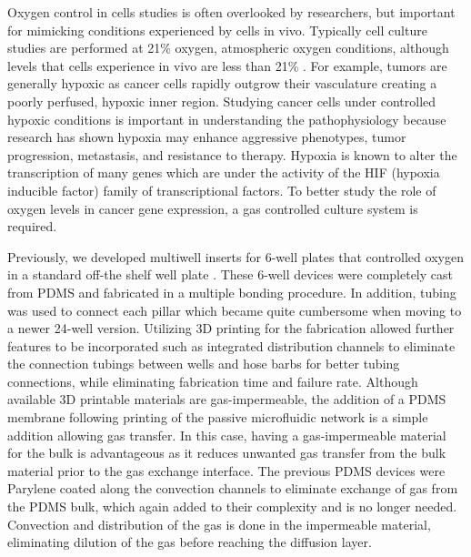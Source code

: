 \documentclass[10pt,letterpaper]{article}
\begin{document}
Oxygen control in cells studies is often overlooked by researchers, but important for mimicking conditions experienced by cells in vivo.
Typically cell culture studies are performed at 21\% oxygen, atmospheric oxygen conditions, although levels that cells experience in vivo are less than 21\% \cite{Brennan2014}.
For example, tumors are generally hypoxic as cancer cells rapidly outgrow their vasculature creating a poorly perfused, hypoxic inner region\cite{Kumar2014}.
Studying cancer cells under controlled hypoxic conditions is important in understanding the pathophysiology because research has shown hypoxia may enhance aggressive phenotypes, tumor progression, metastasis, and resistance to therapy\cite{Vaupel2004,Vaupel2007,Gilkes2014}.
Hypoxia is known to alter the transcription of many genes which are under the activity of the HIF (hypoxia inducible factor) family of transcriptional factors\cite{Ke2006,Semenza1999,Semenza2002}.
To better study the role of oxygen levels in cancer gene expression, a gas controlled culture system is required.

Previously, we developed multiwell inserts for 6-well plates that controlled oxygen in a standard off-the shelf well plate \cite{Oppegard2009, Oppegard2010}.
These 6-well devices were completely cast from PDMS and fabricated in a multiple bonding procedure.
In addition, tubing was used to connect each pillar which became quite cumbersome when moving to a newer 24-well version.
Utilizing 3D printing for the fabrication allowed further features to be incorporated such as integrated distribution channels to eliminate the connection tubings between wells and hose barbs for better tubing connections, while eliminating fabrication time and failure rate.
Although available 3D printable materials are gas-impermeable, the addition of a PDMS membrane following printing of the passive microfluidic network is a simple addition allowing gas transfer. 
In this case, having a gas-impermeable material for the bulk is advantageous as it reduces unwanted gas transfer from the bulk material prior to the gas exchange interface.
The previous PDMS devices were Parylene coated along the convection channels to eliminate exchange of gas from the PDMS bulk, which again added to their complexity and is no longer needed.
Convection and distribution of the gas is done in the impermeable material, eliminating dilution of the gas before reaching the diffusion layer. 

\end{document}
